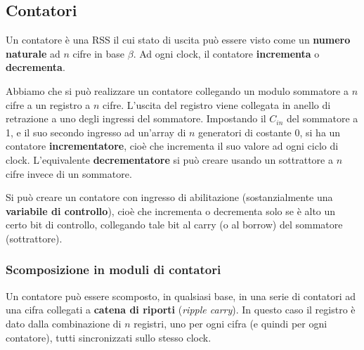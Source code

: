 \documentclass[a4paper,11pt]{article}
\begin{document}
\subsection{Contatori}
Un contatore è una RSS il cui stato di uscita può essere visto come un \textbf{numero naturale} ad $n$ cifre in base $\beta$.
Ad ogni clock, il contatore \textbf{incrementa} o \textbf{decrementa}.

Abbiamo che si può realizzare un contatore collegando un modulo sommatore a $n$ cifre a un registro a $n$ cifre.
L'uscita del registro viene collegata in anello di retrazione a uno degli ingressi del sommatore.
Impostando il $C_{in}$ del sommatore a 1, e il suo secondo ingresso ad un'array di $n$ generatori di costante 0, si ha un contatore \textbf{incrementatore}, cioè che incrementa il suo valore ad ogni ciclo di clock.
L'equivalente \textbf{decrementatore} si può creare usando un sottrattore a $n$ cifre invece di un sommatore.

Si può creare un contatore con ingresso di abilitazione (sostanzialmente una \textbf{variabile di controllo}), cioè che incrementa o decrementa solo se è alto un certo bit di controllo, collegando tale bit al carry (o al borrow) del sommatore (sottrattore).

\subsubsection{Scomposizione in moduli di contatori}
Un contatore può essere scomposto, in qualsiasi base, in una serie di contatori ad una cifra collegati a \textbf{catena di riporti} (\textit{ripple carry}).
In questo caso il registro è dato dalla combinazione di $n$ registri, uno per ogni cifra (e quindi per ogni contatore), tutti sincronizzati sullo stesso clock.
\end{document}
